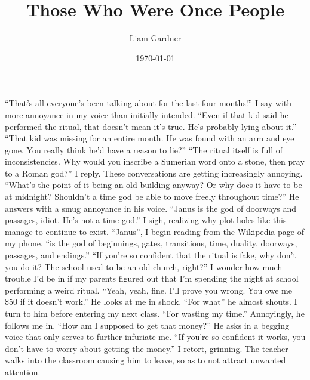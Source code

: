 \documentclass[a4paper, 12pt]{book}
\title{Those Who Were Once People}
\author{Liam Gardner}
\date{\today}
\newcommand\tab[1][1cm]{\hspace*{#1}}
\begin{document}
\newcommand{\AmaGi}{$\stackrel{\hbox{\fontsize{15}{60}\selectfont ama-gi}}{\hbox{\fontsize{30}{60}\selectfont {\symbol{"120BC}\symbol{"12104}}}}$}
\maketitle
\tab
“That’s all everyone’s been talking about for the last four months!” I say with more annoyance in my voice than initially intended. “Even if that kid said he performed the ritual, that doesn’t mean it’s true. He’s probably lying about it.”
\newline
\tab
“That kid was missing for an entire month. He was found with an arm and eye gone. You really think he’d have a reason to lie?” 
\newline
\tab
“The ritual itself is full of inconsistencies. Why would you inscribe a Sumerian word onto a stone, then pray to a Roman god?” I reply. These conversations are getting increasingly annoying. “What’s the point of it being an old building anyway? Or why does it have to be at midnight? Shouldn’t a time god be able to move freely throughout time?”
\newline
\tab
He answers with a smug annoyance in his voice. “Janus is the god of doorways and passages, idiot. He’s not a time god.”
\newline
\tab
I sigh, realizing why plot-holes like this manage to continue to exist. “Janus”, I begin reading from the Wikipedia page of my phone, “is the god of beginnings, gates, transitions, time, duality, doorways, passages, and endings.”
\newline
\tab
“If you’re so confident that the ritual is fake, why don’t you do it? The school used to be an old church, right?”
\newline
\tab
I wonder how much trouble I’d be in if my parents figured out that I’m spending the night at school performing a weird ritual. “Yeah, yeah, fine. I’ll prove you wrong. You owe me \$50 if it doesn’t work.”
\newline
\tab
He looks at me in shock. “For what\textinterrobang” he almost shouts.
\newline
\tab
I turn to him before entering my next class. “For wasting my time.”
\newline
\tab
Annoyingly, he follows me in. “How am I supposed to get that money?” He asks in a begging voice that only serves to further infuriate me.
\newline
\tab
“If you’re so confident it works, you don’t have to worry about getting the money.” I retort, grinning. The teacher walks into the classroom causing him to leave, so as to not attract unwanted attention. 
\end{document}
